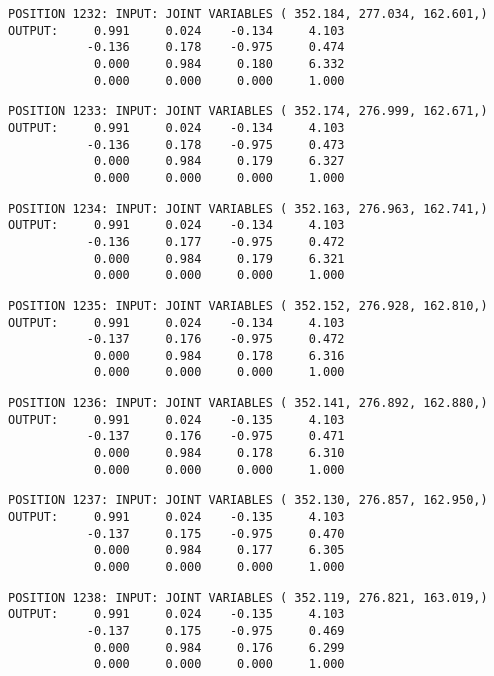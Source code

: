 \begin{verbatim}
POSITION 1232: INPUT: JOINT VARIABLES ( 352.184, 277.034, 162.601,)
OUTPUT:     0.991     0.024    -0.134     4.103
           -0.136     0.178    -0.975     0.474
            0.000     0.984     0.180     6.332
            0.000     0.000     0.000     1.000
\end{verbatim} \pagebreak[1]\begin{verbatim}
POSITION 1233: INPUT: JOINT VARIABLES ( 352.174, 276.999, 162.671,)
OUTPUT:     0.991     0.024    -0.134     4.103
           -0.136     0.178    -0.975     0.473
            0.000     0.984     0.179     6.327
            0.000     0.000     0.000     1.000
\end{verbatim} \pagebreak[1]\begin{verbatim}
POSITION 1234: INPUT: JOINT VARIABLES ( 352.163, 276.963, 162.741,)
OUTPUT:     0.991     0.024    -0.134     4.103
           -0.136     0.177    -0.975     0.472
            0.000     0.984     0.179     6.321
            0.000     0.000     0.000     1.000
\end{verbatim} \pagebreak[1]\begin{verbatim}
POSITION 1235: INPUT: JOINT VARIABLES ( 352.152, 276.928, 162.810,)
OUTPUT:     0.991     0.024    -0.134     4.103
           -0.137     0.176    -0.975     0.472
            0.000     0.984     0.178     6.316
            0.000     0.000     0.000     1.000
\end{verbatim} \pagebreak[1]\begin{verbatim}
POSITION 1236: INPUT: JOINT VARIABLES ( 352.141, 276.892, 162.880,)
OUTPUT:     0.991     0.024    -0.135     4.103
           -0.137     0.176    -0.975     0.471
            0.000     0.984     0.178     6.310
            0.000     0.000     0.000     1.000
\end{verbatim} \pagebreak[1]\begin{verbatim}
POSITION 1237: INPUT: JOINT VARIABLES ( 352.130, 276.857, 162.950,)
OUTPUT:     0.991     0.024    -0.135     4.103
           -0.137     0.175    -0.975     0.470
            0.000     0.984     0.177     6.305
            0.000     0.000     0.000     1.000
\end{verbatim} \pagebreak[1]\begin{verbatim}
POSITION 1238: INPUT: JOINT VARIABLES ( 352.119, 276.821, 163.019,)
OUTPUT:     0.991     0.024    -0.135     4.103
           -0.137     0.175    -0.975     0.469
            0.000     0.984     0.176     6.299
            0.000     0.000     0.000     1.000
\end{verbatim} \pagebreak[1]\begin{verbatim}

\end{verbatim}
